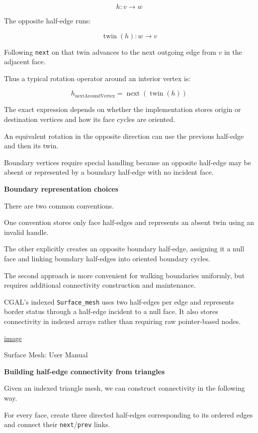 \[
h:v\rightarrow w
\]

The opposite half-edge runs:

\[
\operatorname{twin}(h):w\rightarrow v
\]

Following \texttt{next} on that twin advances to the next outgoing edge from \(v\) in the adjacent face.

Thus a typical rotation operator around an interior vertex is:

\[
\boxed{ h_{\mathrm{nextAroundVertex}} = \operatorname{next}(\operatorname{twin}(h)) }
\]

The exact expression depends on whether the implementation stores origin or destination vertices and how its face cycles are oriented.

An equivalent rotation in the opposite direction can use the previous half-edge and then its twin.

Boundary vertices require special handling because an opposite half-edge may be absent or represented by a boundary half-edge with no incident face.

\textbf{Boundary representation choices}

There are two common conventions.

One convention stores only face half-edges and represents an absent twin using an invalid handle.

The other explicitly creates an opposite boundary half-edge, assigning it a null face and linking boundary half-edges into oriented boundary cycles.

The second approach is more convenient for walking boundaries uniformly, but requires additional connectivity construction and maintenance.

CGAL's indexed \texttt{Surface\_mesh} uses two half-edges per edge and represents border status through a half-edge incident to a null face. It also stores connectivity in indexed arrays rather than requiring raw pointer-based nodes. 

\href{https://www.google.com/s2/favicons?domain=https://doc.cgal.org&sz=32}{image}

Surface Mesh: User Manual

\textbf{Building half-edge connectivity from triangles}

Given an indexed triangle mesh, we can construct connectivity in the following way.

For every face, create three directed half-edges corresponding to its ordered edges and connect their \texttt{next}/\texttt{prev} links.

